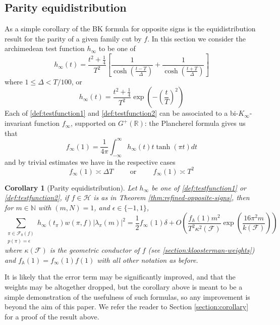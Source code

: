 \documentclass{article}
\newtheorem{corollary}[theorem]{Corollary}
\numberwithin{equation}{section}
\begin{document}
\subsection{Parity equidistribution}
As a simple corollary of the BK formula for opposite signs is the equidistribution result for the parity of a given family cut by $f$. In this section we consider the archimedean test function $h_\infty$ to be one of
\begin{equation}\label{def:testfunction1}
    h_\infty(t)=\frac{t^2+\frac{1}{4}}{T^2}\left[\frac{1}{\cosh\left(\frac{t-T}{\Delta}\right)}+\frac{1}{\cosh\left(\frac{t+T}{\Delta}\right) }\right]
\end{equation}
where $1 \leq \Delta < T/100$, or
\begin{equation}\label{def:testfunction2}
    h_\infty(t) = \frac{t^2+\frac{1}{4}}{T^2}\exp\left(-\left(\frac{t}{T}\right)^2\right)
\end{equation}
Each of \eqref{def:testfunction1}  and \eqref{def:testfunction2} can be associated to a bi-$K_\infty$-invariant function $f_\infty$, supported on $G^+(\mathbb{R})$: the Plancherel formula gives us that
\begin{equation*}
    f_\infty(1)=\frac{1}{4\pi}\int_{-\infty}^{\infty}h_\infty(t)t\tanh(\pi t)dt
\end{equation*}
and by trivial estimates we have in the respective cases
\begin{equation}
    f_\infty(1)\asymp\Delta T \hspace{1cm} \text{or} \hspace{1cm} f_\infty(1)\asymp T^2
\end{equation}

\begin{corollary}[Parity equidistribution]\label{cor:equidistribution}
    Let $h_\infty$ be one of \eqref{def:testfunction1} or \eqref{def:testfunction2}, if $f \in \mathcal{H}$ is as in Theorem \ref{thm:refined-opposite-signs}, then for $m \in \mathbb{N}$ with $(m,N)=1$, and $\epsilon \in \{-1,1\}$,
    \begin{equation}
        \sum_{\substack{\pi \in \mathcal{F}_0(f) \\ p(\pi)=\epsilon}}h_\infty(t_\pi)w(\pi,f)|\lambda_\pi(m)|^2=\frac{1}{2}f_\infty(1)\delta+O\left (\frac{f_\mathbb{A}(1)m^2}{T^2\kappa^2(\mathcal{F})} \exp\left(\frac{16\pi^2 m}{k(\mathcal{F})}\right)\right)
    \end{equation}
    where $\kappa(\mathcal{F})$ is the geometric conductor of $f$ (see \ref{section:kloosterman-weights}) and $f_\mathbb{A}(1)=f_\infty(1)f(1)$ with all other notation as before.
\end{corollary}
It is likely that the error term may be significantly improved, and that the weights may be altogether dropped, but the corollary above is meant to be a simple demonstration of the usefulness of such formulas, so any improvement is beyond the aim of this paper. We refer the reader to Section \ref{section:corollary} for a proof of the result above.
\end{document}
